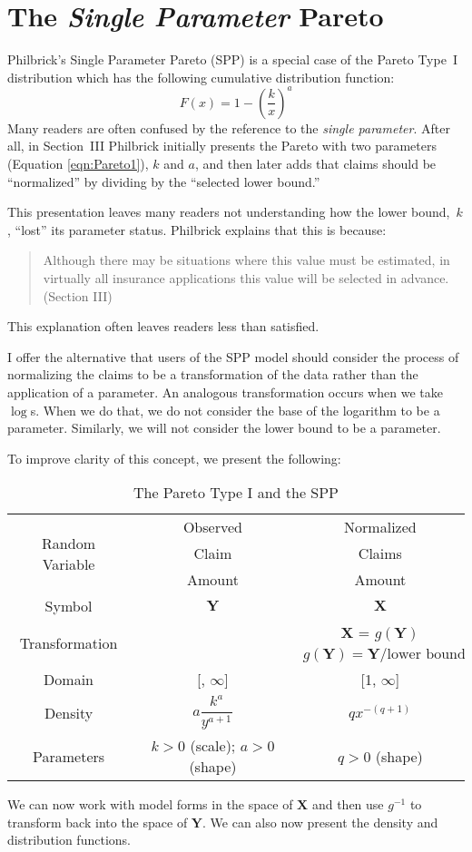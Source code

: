 \section{The \emph{Single Parameter} Pareto}\label{sec:theSPP}
Philbrick's Single Parameter Pareto (SPP) is a special case of the Pareto Type~I distribution which has the following cumulative distribution function:
\begin{equation}
F(x) = 1 - \left(\frac{k}{x} \right)^a\label{eqn:Pareto1}
\end{equation}
Many readers are often confused by the reference to the \emph{single parameter}. After all, in Section~III Philbrick initially presents the Pareto with two parameters (Equation \ref{eqn:Pareto1}), $k$ and $a$, and then later adds that claims should be ``normalized'' by dividing by the ``selected lower bound.''

This presentation leaves many readers not understanding how the lower bound,~$k$,  ``lost'' its parameter status. Philbrick explains that this is because:
\begin{quote}
	Although there may be situations where this value must be estimated, in virtually all insurance applications this value will be selected in advance. (Section III)
\end{quote}
This explanation often leaves readers less than satisfied.

I offer the alternative that users of the SPP model should consider the process of normalizing the claims to be a transformation of the data rather than the application of a parameter. An analogous transformation occurs when we take $\log$s. When we do that, we do not consider the base of the logarithm to be a parameter. Similarly, we will not consider the lower bound to be a parameter.

To improve clarity of this concept, we present the following:

\begin{table}[h!]
	\centering
	\begin{tabular}[h]{ccc}
		\toprule
		\multirow{3}{*}{Random Variable}& Observed & Normalized\\
		& Claim & Claims\\
		& Amount & Amount \\ \midrule
		Symbol & $\mathbf{Y}$ & $\mathbf{X}$\\ \midrule
		\multirow{2}{*}{Transformation} & & $\mathbf{X}$  =  $g(\mathbf{Y})$\\
		& & $g(\mathbf{Y}) =   \mathbf{Y}/\text{lower bound}$  \\ \midrule
		Domain & [\text{lower bound}, $\infty$] & [1, $\infty$]\\ \midrule
		Density & $a \dfrac{k^a}{y^{a+1}}$ & $qx^{-(q+1)}$\\ \midrule
		Parameters & $k>0$ (scale); $a>0$ (shape)& $q>0$ (shape)\\ 
	\bottomrule
	\end{tabular}
	\caption{The Pareto Type I and the SPP}\label{tbl:PIvSpp}			
\end{table}
We can now work with model forms in the space of $\mathbf{X}$ and then use $g^{-1}$ to transform back into the space of $\mathbf{Y}$. We can also now present the density and distribution functions.

